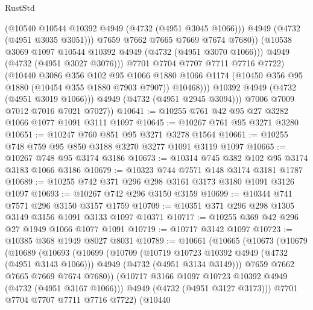 \begin{lexlean}{RustStd}
\begin{coremodule}
{\begin{coremodule}
{{{{{{{{{{{{{{                          (@10540 @10544 @10392 @4949 (@4732 (@4951 @3045 @1066)))
                          @4949
                          (@4732 (@4951 @3035 @3051)))
                        @7659
                        @7662
                        @7665
                        @7669
                        @7674
                        @7680))
                    (@10538 @3069 @1097 @10544 @10392 @4949 (@4732 (@4951 @3070 @1066)))
                    @4949
                    (@4732 (@4951 @3027 @3076)))
                  @7701
                  @7704
                  @7707
                  @7711
                  @7716
                  @7722)
                (@10440
                  @3086
                  @356
                  @102
                  @95
                  @1066
                  @1880
                  @1066
                  @1174
                  (@10450 @356 @95 @1880 (@10454 @355 @1880 @7903 @7907))
                  @10468)))
            @10392
            @4949
            (@4732 (@4951 @3019 @1066)))
          @4949
          (@4732 (@4951 @2945 @3094)))
        @7006
        @7009
        @7012
        @7016
        @7021
        @7027))
@10641 := @10255 @761 @42 @95 @27 @3282 @1066 @1077 @1091 @3111 @1097
@10645 := @10267 @761 @95 @3271 @3280
@10651 := @10247 @760 @851 @95 @3271 @3278 @1564
@10661 := @10255 @748 @759 @95 @850 @3188 @3270 @3277 @1091 @3119 @1097
@10665 := @10267 @748 @95 @3174 @3186
@10673 := @10314 @745 @382 @102 @95 @3174 @3183 @1066 @3186
@10679 := @10323 @744 @7571 @148 @3174 @3181 @1787
@10689 := @10255 @742 @371 @296 @298 @3161 @3173 @3180 @1091 @3126 @1097
@10693 := @10267 @742 @296 @3150 @3159
@10699 := @10344 @741 @7571 @296 @3150 @3157 @1759
@10709 := @10351 @371 @296 @298 @1305 @3149 @3156 @1091 @3133 @1097 @10371
@10717 := @10255 @369 @42 @296 @27 @1949 @1066 @1077 @1091
@10719 := @10717 @3142 @1097
@10723 := @10385 @368 @1949 @8027 @8031
@10789 := @10661
    (@10665
      (@10673
        (@10679
          (@10689
            (@10693
              (@10699
                (@10709
                  (@10719 @10723 @10392 @4949 (@4732 (@4951 @3143 @1066)))
                  @4949
                  (@4732 (@4951 @3134 @3149)))
                @7659
                @7662
                @7665
                @7669
                @7674
                @7680))
            (@10717 @3166 @1097 @10723 @10392 @4949 (@4732 (@4951 @3167 @1066)))
            @4949
            (@4732 (@4951 @3127 @3173)))
          @7701
          @7704
          @7707
          @7711
          @7716
          @7722)
        (@10440
}}}}}}}}}}}}}}
\end{coremodule}}
\end{coremodule}
\end{lexlean}
